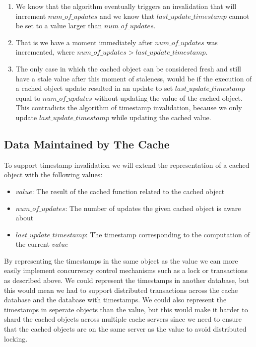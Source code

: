 \begin{enumerate}
  \item We know that the algorithm eventually triggers an invalidation that will increment $num\_of\_updates$ and we know that $last\_update\_timestamp$ cannot be set to a value larger than $num\_of\_updates$.
  \item That is we have a moment immediately after $num\_of\_updates$ was incremented, where $num\_of\_updates > last\_update\_timestamp$.
  \item The only case in which the cached object can be considered fresh and still have a stale value after this moment of staleness, would be if the execution of a cached object update resulted in an update to set $last\_update\_timestamp$ equal to $num\_of\_updates$ without updating the value of the cached object. This contradicts the algorithm of timestamp invalidation, because we only update $last\_update\_timestamp$ while updating the cached value.
\end{enumerate}



\subsection{Data Maintained by The Cache}
\label{subsec:data-maintained-by-the-cache}

To support timestamp invalidation we will extend the representation of a cached object with the following values:

\begin{itemize}
  \item $value$: The result of the cached function related to the cached object
  \item $num\_of\_updates$: The number of updates the given cached object is aware about
  \item $last\_update\_timestamp$: The timestamp corresponding to the computation of the current $value$
\end{itemize}

By representing the timestamps in the same object as the value we can more easily implement concurrency control mechanisms such as a lock or transactions as described above. We could represent the timestamps in another database, but this would mean we had to support distributed transactions across the cache database and the database with timestamps. We could also represent the timestamps in seperate objects than the value, but this would make it harder to shard the cached objects across multiple cache servers since we need to ensure that the cached objects are on the same server as the value to avoid distributed locking.

